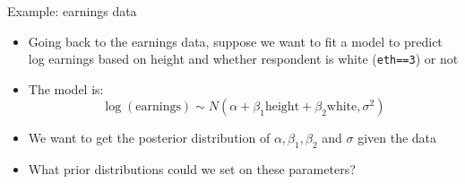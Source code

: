\documentclass[ignorenonframetext,]{beamer}
\providecommand{\tightlist}{%
  \setlength{\itemsep}{0pt}\setlength{\parskip}{0pt}}
\begin{document}
\begin{frame}[fragile]{Example: earnings data}

\begin{itemize}
\tightlist
\item
  Going back to the earnings data, suppose we want to fit a model to
  predict log earnings based on height and whether respondent is white
  (\texttt{eth==3}) or not
\item
  The model is:
  \[\log(\mbox{earnings}) \sim N(\alpha + \beta_1 \mbox{height} + \beta_2 \mbox{white}, \sigma^2)\]
\item
  We want to get the posterior distribution of
  \(\alpha, \beta_1, \beta_2\) and \(\sigma\) given the data
\item
  What prior distributions could we set on these parameters?
\end{itemize}

\end{frame}
\end{document}
